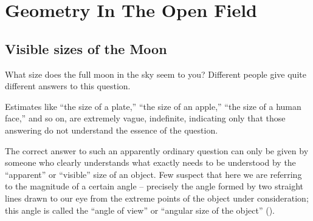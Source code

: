 

\chapter{Geometry In The Open Field}
\label{ch-03}

\section{Visible sizes of the Moon}
\label{sec-3.1}


What size does the full moon in the sky seem to you? Different people give quite different answers to this question.

Estimates like ``the size of a plate,'' ``the size of an apple,'' ``the size of a human face,'' and so on, are extremely vague, indefinite, indicating only that those answering do not understand the essence of the question.

The correct answer to such an apparently ordinary question can only be given by someone who clearly understands what exactly needs to be understood by the ``apparent'' or ``visible'' size of an object. Few suspect that here we are referring to the magnitude of a certain angle -- precisely the angle formed by two straight lines drawn to our eye from the extreme points of the object under consideration; this angle is called the ``angle of view'' or ``angular size of the object'' (). 


